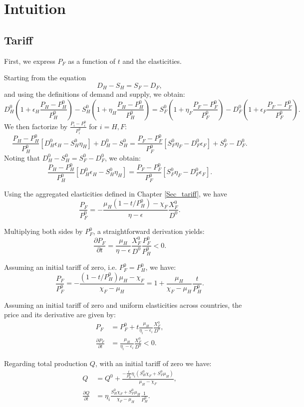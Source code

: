 \chapter{Intuition}\label{appendix:intuitions}

\section{Tariff}\label{appendix:intuitions_tariff}

First, we express $P_F$ as a function of $t$ and the elasticities.

Starting from the equation 
$$
D_H - S_H = S_F - D_F,
$$ 
and using the definitions of demand and supply, we obtain:
$$
D_H^0\left(1+\epsilon_H \frac{P_H - P_H^0}{P_H^0}\right) - S_H^0\left(1+\eta_H \frac{P_H - P_H^0}{P_H^0}\right) = S_F^0 \left(1+\eta_F \frac{P_F - P_F^0}{P_F^0}\right) - D_F^0\left(1+\epsilon_F \frac{P_F - P_F^0}{P_F^0}\right).
$$
We then factorize by $\frac{P_i-P_i^0}{P_i^0}$ for $i = H,F$:
$$
\frac{P_H - P_H^0}{P_H^0} [D_H^0 \epsilon_H - S_H^0 \eta_H] + D_H^0 - S_H^0 = \frac{P_F - P_F^0}{P_F^0} [S_F^0 \eta_F - D_F^0 \epsilon_F] + S_F^0 - D_F^0.
$$
Noting that $D_H^0 - S_H^0 = S_F^0 - D_F^0$, we obtain:
$$
\frac{P_H - P_H^0}{P_H^0} [D_H^0 \epsilon_H - S_H^0 \eta_H] = \frac{P_F - P_F^0}{P_F^0} [S_F^0 \eta_F - D_F^0 \epsilon_F].
$$

Using the aggregated elasticities defined in Chapter \ref{Sec_tariff}, we have 
$$
\frac{P_F}{P_F^0}= -\frac{\mu_H (1 - t/P_H^0) - \chi_F}{\eta-\epsilon}\frac{X_F^0}{D^0}.
$$

Multiplying both sides by $P_F^0$, a straightforward derivation yields:
$$
\frac{\partial P_F}{\partial t} = \frac{\mu_H}{\eta - \epsilon} \frac{X_F^0}{D^0} \frac{P_F^0}{P_H^0} < 0.
$$

Assuming an initial tariff of zero, i.e. $P_F^0 = P_H^0$, we have:
$$
\frac{P_F}{P_F^0} = - \frac{(1 - t/P_H^0)\mu_H - \chi_F}{\chi_F - \mu_H} = 1+\frac{\mu_H}{\chi_F - \mu_H}\frac{t}{P_H^0}.
$$

Assuming an initial tariff of zero and uniform elasticities across countries, the price and its derivative are given by:
\begin{align*}
P_F &= P_F^0 + t \frac{\mu_H}{\eta_i - \epsilon_i} \frac{X_F^0}{D^0}, \\
\frac{\partial P_F}{\partial t} &= \frac{\mu_H}{\eta_i - \epsilon_i} \frac{X_F^0}{D^0} < 0.
\end{align*}

Regarding total production $Q$, with an initial tariff of zero we have:
\begin{align*}
Q &= Q^0 + \frac{- \frac{t}{P_H^0}\eta_i(S_H^0 \chi_F + S_F^0 \mu_H)}{\mu_H - \chi_F}, \\
\frac{\partial Q}{\partial t} &= \eta_i \frac{S_H^0 \chi_F + S_F^0 \mu_H}{\chi_F - \mu_H}\frac{1}{P_H^0}.
\end{align*}


